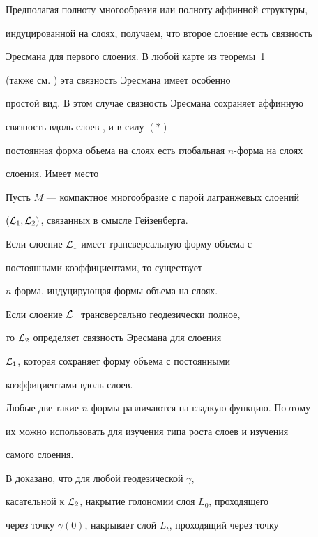 Предполагая полноту многообразия или полноту аффинной структуры,


индуцированной на слоях, получаем, что второе слоение есть связность


Эресмана для первого слоения. В любой карте из теоремы~1


(также см. \cite{BO}) эта связность Эресмана имеет особенно


простой вид. В этом случае связность Эресмана сохраняет аффинную


связность вдоль слоев \cite{WO1}, и в силу $(*)$


постоянная форма объема на слоях есть глобальная $n$-форма на слоях


слоения. Имеет место





\begin{thm}


Пусть $M$ --- компактное многообразие с парой лагранжевых слоений


$({\cal L}_1, {\cal L}_2)$, связанных в смысле Гейзенберга.


Если слоение ${\cal L}_1$ имеет трансверсальную форму объема с


постоянными коэффициентами, то существует


$n$-форма, индуцирующая формы объема на слоях.


Если слоение ${\cal L}_1$ трансверсально геодезически полное,


то ${\cal L}_2$ определяет связность Эресмана для слоения


${\cal L}_1$, которая сохраняет форму объема с постоянными


коэффициентами вдоль слоев.


\end{thm}





Любые две такие $n$-формы различаются на гладкую функцию. Поэтому


их можно использовать для изучения типа роста слоев и изучения


самого слоения.





В \cite{WO5} доказано, что для любой геодезической $\gamma$,


касательной к ${\cal L}_2$, накрытие голономии слоя $L_0$, проходящего


через точку $\gamma(0)$, накрывает слой $L_t$, проходящий через точку


